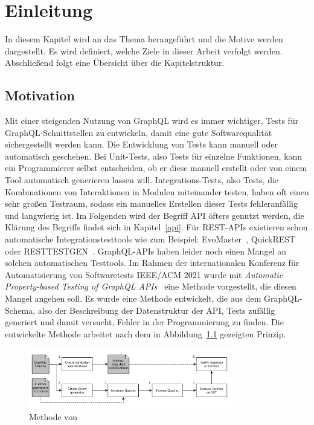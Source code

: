 \chapter{Einleitung}

In diesem Kapitel wird an das Thema herangeführt und die Motive werden dargestellt.
Es wird definiert, welche Ziele in dieser Arbeit verfolgt werden.
Abschließend folgt eine Übersicht über die Kapitelstruktur.

\section{Motivation}

Mit einer steigenden Nutzung von GraphQL wird es immer wichtiger, Tests für GraphQL-Schnittstellen zu entwickeln, damit eine gute Softwarequalität sichergestellt werden kann.
Die Entwicklung von Tests kann manuell oder automatisch geschehen.
Bei Unit-Tests, also Tests für einzelne Funktionen, kann ein Programmierer selbst entscheiden, ob er diese manuell erstellt
oder von einem Tool automatisch generieren lassen will.
Integrations-Tests, also Tests, die Kombinationen von Interaktionen in Modulen miteinander testen, haben oft
einen sehr großen Testraum, sodass ein manuelles Erstellen dieser Tests fehleranfällig und langwierig ist.
Im Folgenden wird der Begriff API öfters genutzt werden, die Klärung des Begriffs findet sich in Kapitel~\ref{api}.
Für REST-APIs existieren schon automatische Integrationstesttools wie zum Beispiel: EvoMaster~\cite{evo-master}, QuickREST~\cite{karlsson2019quickrest} oder RESTTESTGEN~\cite{rest-test-gen}.
GraphQL-APIs haben leider noch einen Mangel an solchen automatischen Testtools.
Im Rahmen der internationalen  Konferenz für Automatisierung  von  Softwaretests IEEE/ACM 2021 wurde mit
\textit{Automatic Property-based Testing of GraphQL APIs}~\cite{property-based-testing} eine Methode vorgestellt, die diesen Mangel angehen soll.
Es wurde eine Methode entwickelt, die aus dem GraphQL-Schema, also der Beschreibung der Datenstruktur der API, Tests zufällig generiert und damit versucht, Fehler in der Programmierung zu finden.
Die entwickelte Methode arbeitet nach dem in Abbildung~\ref{property-based-method} gezeigten Prinzip.

\begin{figure}[h]
    \centering
    \includegraphics[width=0.8\textwidth,keepaspectratio]{content/einleitung/toolchain}
    \caption{Methode von~\cite{property-based-testing}}
    \label{property-based-method}
\end{figure}
\newpage

